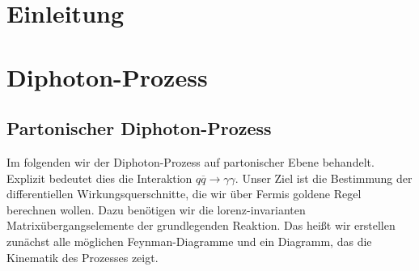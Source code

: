 

\newcommand*{\titel}{Anwendung von maschinellem Lernen zur Regression am Beispiel des Diphoton-Prozesses}
\newcommand*{\autor}{Andreas Weitzel}
\newcommand*{\geburtsort}{Fulda}
\newcommand*{\geburtsdatum}{10.08.1999}
\newcommand*{\datum}{24.05.2021}
\newcommand*{\institut}{Institut füer Kern- und Teilchenphysik}
\newcommand*{\arbeitsgruppe}{Emmy-Noether-Nachwuchsgruppe}
\newcommand*{\erstgutachter}{Dr. Frank Siegert}
\newcommand*{\zweitgutachter}{Prof. Dr. Arno Streassner}
\newcommand*{\hochschulgrad}{Bachelor of Science}
\newcommand*{\studiengang}{Physik}
\newcommand*{\abschlussarbeit}{Bachelor-Arbeit}
\newcommand*{\schlagworte}{Deep-Learning}

\newcommand{\abstractde}{
<Zusammenfassung deutsch>
In dieser Arbeit werden Sie die beste Bachelor-Arbeit der Welt finden.
}
\newcommand{\abstracten}{
<Abstract english>
}


%

%



%
%
\chapter{Einleitung}


\chapter{Diphoton-Prozess}
\section{Partonischer Diphoton-Prozess}
Im folgenden wir der Diphoton-Prozess auf partonischer Ebene behandelt. Explizit bedeutet dies die Interaktion $q\overline{q} \rightarrow \gamma \gamma$. Unser Ziel ist die Bestimmung der differentiellen Wirkungsquerschnitte, die wir über Fermis goldene Regel berechnen wollen. Dazu benötigen wir die lorenz-invarianten Matrixübergangselemente der grundlegenden Reaktion. Das heißt wir erstellen zunächst alle möglichen Feynman-Diagramme und ein Diagramm, das die Kinematik des Prozesses zeigt. 


